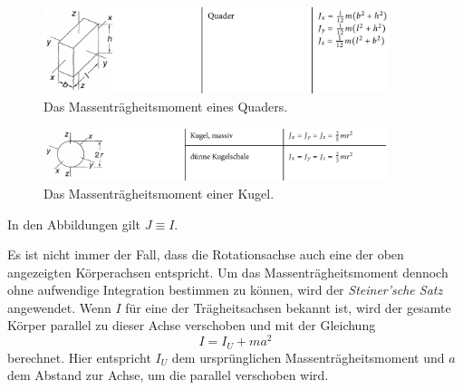 \begin{figure}
    \centering
    \includegraphics[width=0.9\textwidth]{plots/TrägheitQuader.png}
    \caption{Das Massenträgheitsmoment eines Quaders.\cite{taschenbuch}}
    \label{fig:traegQuader}
\end{figure}

\begin{figure}
    \centering
    \includegraphics[width=0.9\textwidth]{plots/TrägheitKugel.png}
    \caption{Das Massenträgheitsmoment einer Kugel.\cite{taschenbuch}}
    \label{fig:traegKug}
\end{figure}

In den Abbildungen gilt $J \equiv I$.

Es ist nicht immer der Fall, dass die Rotationsachse auch eine der oben angezeigten Körperachsen entspricht.
Um das Massenträgheitsmoment dennoch ohne aufwendige Integration bestimmen zu können, wird der \textit{Steiner'sche
Satz} angewendet. Wenn $I$ für eine der Trägheitsachsen bekannt ist, wird der gesamte Körper parallel
zu dieser Achse verschoben und mit der Gleichung
\begin{equation}
    I = I_U + ma^2
\end{equation}
berechnet. Hier entspricht $I_U$ dem ursprünglichen Massenträgheitsmoment und $a$ dem Abstand zur Achse, um die 
parallel verschoben wird.
